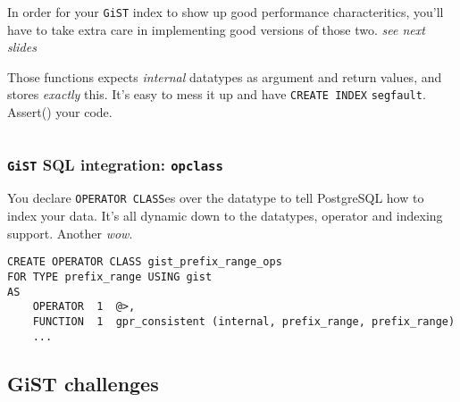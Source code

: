 \documentclass{beamer}
\begin{document}
\begin{frame}[fragile]
\begin{columns}[c]
\begin{overprint}
  In order for your \texttt{GiST} index to show up good performance
  characteritics, you'll have to take extra care in implementing good
  versions of those two.
  \linebreak
  \linebreak
  \textit{see next slides}


  Those functions expects \textit{internal} datatypes as argument and return
  values, and stores \textit{exactly} this.
  \linebreak
  \linebreak
  It's easy to mess it up and have \texttt{CREATE INDEX}
  \texttt{segfault}. \alert{Assert()} your code.

  \end{overprint}

\end{columns}
\end{frame}

\begin{frame}[fragile]
  \frametitle{\texttt{GiST} SQL integration: \texttt{opclass}}

  You declare \texttt{OPERATOR CLASS}es over the datatype to tell PostgreSQL
  how to index your data. It's all dynamic down to the datatypes, operator
  and indexing support. Another \textit{wow}.

  \pause

  \begin{example}
  \begin{verbatim}
CREATE OPERATOR CLASS gist_prefix_range_ops
FOR TYPE prefix_range USING gist 
AS
    OPERATOR  1  @>,
    FUNCTION  1  gpr_consistent (internal, prefix_range, prefix_range)
    ...
  \end{verbatim}
  \end{example}
\end{frame}


\subsection{GiST challenges}
\end{document}
